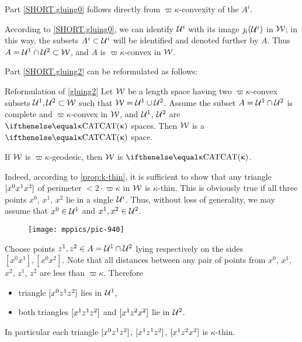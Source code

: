 Part \ref{SHORT.gluing0}
follows directly from $\varpi\kappa$-convexity of the $A^i$.

According to \ref{SHORT.gluing0},
we can identify $\mathcal{U}^i$ with its image $\jmath_i(\mathcal{U}^i)$ in $\mathcal{W}$;
in this way, the subsets $A^i\subset \spc{U}^i$ will be identified and denoted further by $A$.
Thus   $A=\spc{U}^1\cap \spc{U}^2\subset \spc{W}$,
and $A$ is $\varpi\kappa$-convex in $\mathcal{W}$.

Part \ref{SHORT.gluing2} can be reformulated as follows:

\begin{thm}{Reformulation of \ref{gluing2}}\label{thm:gluing2-reformulated}
Let $\mathcal{W}$ be a 
length space having two 
$\varpi\kappa$-convex subsets $\spc{U}^1,\spc{U}^2\subset\spc{W}$ such that
$\spc{W}=\spc{U}^1\cup\spc{U}^2$.
Assume the subset $A=\spc{U}^1\cap \spc{U}^2$ is complete and $\varpi\kappa$-convex in $\mathcal{W}$, and $\mathcal{U}^1$, $\mathcal{U}^2$ are $\CAT\kappa$ spaces.
Then $\mathcal{W}$ is a $\CAT\kappa$ space.
\end{thm}

\begin{clm}{}\label{clm:geod-gluing}
If $\mathcal{W}$ is $\varpi\kappa$-geodesic, then $\mathcal{W}$ is $\CAT\kappa$.
\end{clm}

Indeed, 
according to \ref{prop:k-thin},
it is sufficient to show that any triangle $[{x^0}{x^1}{x^2}]$ of perimeter $<2\cdot \varpi\kappa$ 
in $\mathcal{W}$ is $\kappa$-thin.
This is obviously true if all three points $x^0$, $x^1$, $x^2$ lie in a single $\mathcal{U}^i$.
Thus, without loss of generality, we may assume that $x^0\in\spc{U}^1$ and $x^1,x^2\in\spc{U}^2$.
\begin{figure}[!ht]
\vskip-0mm
\centering
\texttt{[image: mppics/pic-940]}
\end{figure}

Choose points $z^1,z^2\in A=\spc{U}^1\cap\spc{U}^2$ 
lying respectively on the sides $[x^0x^1], [x^0x^2]$.
Note that all distances between any pair of points from $x^0$, $x^1$, $x^2$, $z^1$, $z^2$ are less than $\varpi\kappa$.
Therefore
\begin{itemize}
\item triangle $[{x^0}{z^1}{z^2}]$ lies in $\mathcal{U}^1$,
\item both triangles $[{x^1}{z^1}{z^2}]$ and $[{x^1}{z^2}{x^2}]$ lie in $\mathcal{U}^2$.
\end{itemize}
In particular each triangle $[{x^0}{z^1}{z^2}]$,
$[{x^1}{z^1}{z^2}]$, $[{x^1}{z^2}{x^2}]$ is $\kappa$-thin.

